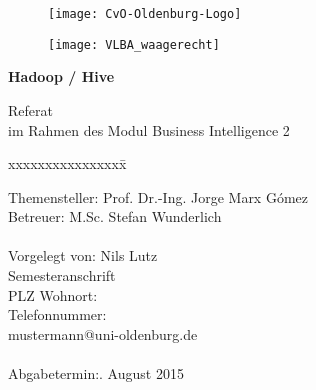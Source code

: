 
\begin{titlepage}
  \begin{centering}
  \begin{figure}[h!]
    \centering
    \texttt{[image: CvO-Oldenburg-Logo]}    %
  \end{figure}

  \vspace*{-0.8cm}

  \begin{figure}[h!]
    \centering
    \texttt{[image: VLBA\_waagerecht]}    %
  \end{figure}

  \vspace*{0.4cm}
  
  \textsf{\Huge \textbf{Hadoop / Hive\\}}

  \vspace*{0.5cm}
  \noindent Referat\\
  im Rahmen des Modul Business Intelligence 2     %

  \end{centering}
  \vspace*{1.5cm}
  \begin{tabbing}
  xxxxxxxxxxxxxxxx\= \kill
  
  \small Themensteller:\> Prof. Dr.-Ing. Jorge Marx Gómez\\
  \small Betreuer:\> M.Sc. Stefan Wunderlich\\\\

  \small Vorgelegt von: \>Nils Lutz\\
  \small \>Semesteranschrift\\
  \small \>PLZ Wohnort:\\
  \small \>Telefonnummer:\\
  \small \>mustermann@uni-oldenburg.de\\\\

  \small Abgabetermin:. August 2015
  \end{tabbing}
\end{titlepage}
